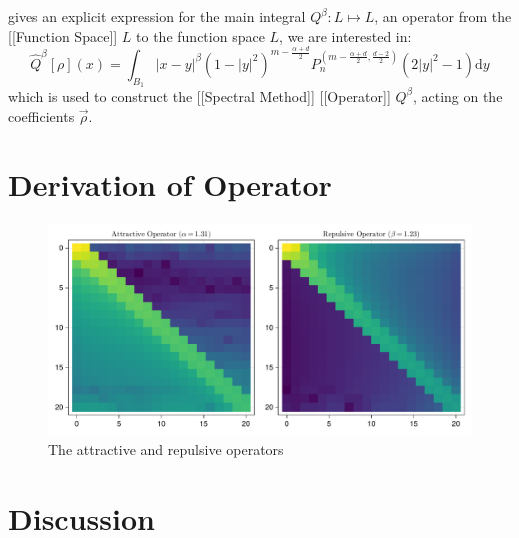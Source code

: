  gives an explicit expression for the main integral
\(Q^{\beta}: L \mapsto L\), an operator from the {[}{[}Function
Space{]}{]} \(L\) to the function space \(L\), we are interested in:
\[\hat{Q}^{\beta}[\rho](x) = \int_{B_1} |x-y|^\beta (1-|y|^2)^{m-\frac{\alpha+d}{2}} P_n^{(m-
  \frac{\alpha+d}{2},\frac{d-2}{2})}(2|y|^2-1) \mathrm{d}y\] which is used
to construct the {[}{[}Spectral Method{]}{]} {[}{[}Operator{]}{]}
\(Q^\beta\), acting on the coefficients \(\vec{\rho}\).

\section{Derivation of Operator}


\begin{figure}[H]
  \centering
  \label{fig:attractive-repulsive}
  \includegraphics[width=\linewidth]{../figures/results/attractive-repulsive-operator.pdf}
  \caption{The attractive and repulsive operators}
\end{figure}

\section{Discussion}



